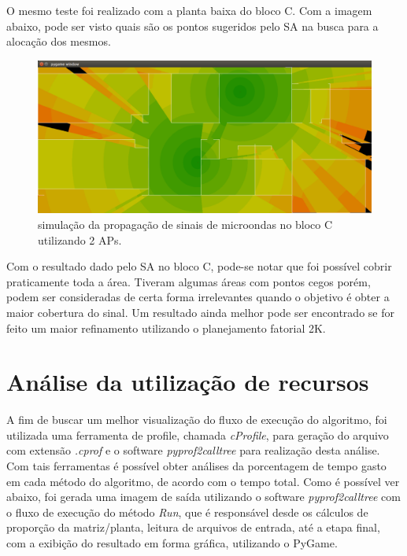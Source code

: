 \documentclass[
	12pt,				%
	openright,			%
	twoside,			%
	a4paper,			%
	english,			%
	french,				%
	spanish,			%
	brazil				%
	]{abntex2}
\begin{document}
O mesmo teste foi realizado com a planta baixa do bloco C. Com a imagem abaixo, pode ser visto quais são os pontos sugeridos pelo SA na busca para a alocação dos mesmos.

\begin{figure}[ht]
	\caption{\label{captura-dois-aps-C}simulação da propagação de sinais de microondas no bloco C utilizando 2 APs.
	}
	\begin{center}
		\includegraphics[scale=0.3]{images/captura-2-aps-bloco-c.jpg}
	\end{center}
\end{figure}

Com o resultado dado pelo SA no bloco C, pode-se notar que foi possível cobrir praticamente toda a área. Tiveram algumas áreas com pontos cegos porém, podem ser consideradas de certa forma irrelevantes quando o objetivo é obter a maior cobertura do sinal. Um resultado ainda melhor pode ser encontrado se for feito um maior refinamento utilizando o planejamento fatorial 2K.


\section[Análise da utilização de recursos]{Análise da utilização de recursos}

A fim de buscar um melhor visualização do fluxo de execução do algoritmo, foi utilizada uma ferramenta de profile, chamada \textit{cProfile}, para geração do arquivo com extensão \textit{.cprof} e o software \textit{pyprof2calltree} para realização desta análise. Com tais ferramentas é possível obter análises da porcentagem de tempo gasto em cada método do algoritmo, de acordo com o tempo total. Como é possível ver abaixo, foi gerada uma imagem de saída utilizando o software \textit{pyprof2calltree} com o fluxo de execução do método \textit{Run}, que é responsável desde os cálculos de proporção da matriz/planta, leitura de arquivos de entrada, até a etapa final, com a exibição do resultado em forma gráfica, utilizando o PyGame.
\end{document}
